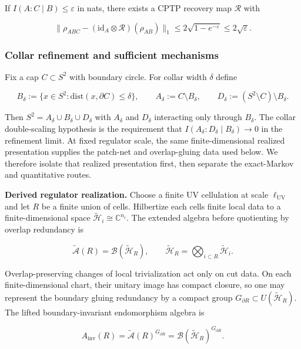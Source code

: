 If \(I(A:C \mid B) \le \varepsilon\) in nats, there exists a CPTP recovery map \(\mathcal{R}\) with

\[
\| \rho_{ABC} - (\mathrm{id}_A \otimes \mathcal R)(\rho_{AB}) \|_1
\le 2\sqrt{1-e^{-\varepsilon}}
\le 2\sqrt{\varepsilon}.
\]

\subsubsection{Collar refinement and sufficient mechanisms}\label{23-collar-refinement-and-sufficient-mechanisms}

Fix a cap \(C \subset S^2\) with boundary circle. For collar width \(\delta\) define

\[
B_\delta := \{x \in S^2 : \mathrm{dist}(x,\partial C) \le \delta\},
\qquad
A_\delta := C \setminus B_\delta,
\qquad
D_\delta := (S^2 \setminus C) \setminus B_\delta.
\]

Then \(S^2 = A_\delta \cup B_\delta \cup D_\delta\) with \(A_\delta\) and \(D_\delta\) interacting only through \(B_\delta\). The collar double-scaling hypothesis is the requirement that \(I(A_\delta:D_\delta \mid B_\delta) \to 0\) in the refinement limit. At fixed regulator scale, the same finite-dimensional realized presentation supplies the patch-net and overlap-gluing data used below. We therefore isolate that realized presentation first, then separate the exact-Markov and quantitative routes.



\textbf{Derived regulator realization.} Choose a finite UV cellulation at scale \(\ell_{\mathrm{UV}}\) and let \(R\) be a finite union of cells. Hilbertize each cell\textquotesingle s finite local data to a finite-dimensional space \(\tilde{\mathcal H}_i\cong \mathbb C^{n_i}\). The extended algebra before quotienting by overlap redundancy is

\[
\widetilde{\mathcal A}(R)=\mathcal B(\tilde{\mathcal H}_R),
\qquad
\tilde{\mathcal H}_R=\bigotimes_{i\subset R}\tilde{\mathcal H}_i.
\]

Overlap-preserving changes of local trivialization act only on cut data. On each finite-dimensional chart, their unitary image has compact closure, so one may represent the boundary gluing redundancy by a compact group \(G_{\partial R}\subset U(\tilde{\mathcal H}_R)\). The lifted boundary-invariant endomorphism algebra is

\[
A_{\mathrm{inv}}(R)=\widetilde{\mathcal A}(R)^{G_{\partial R}}
=\mathcal B(\tilde{\mathcal H}_R)^{G_{\partial R}}.
\]

